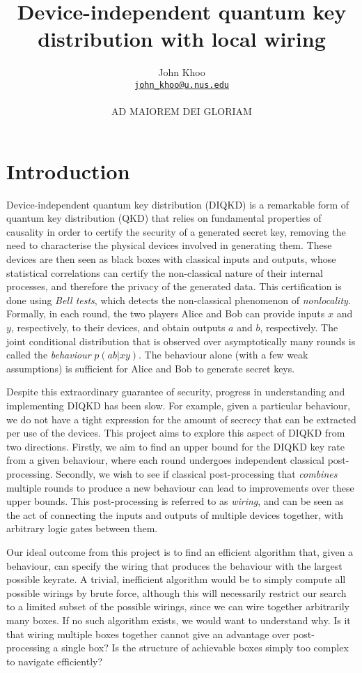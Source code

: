 \documentclass[10pt, a4paper]{article}
\title{Device-independent quantum key distribution with local wiring}
\author{John Khoo\\ \href{mailto:john_khoo@u.nus.edu}{\texttt{john\_khoo@u.nus.edu}} \\\\ AD MAIOREM DEI GLORIAM}
\newcommand{\?}{\mathrel{?}} %
\numberwithin{equation}{section} %
\theoremstyle{definition}
\theoremstyle{plain}
\theoremstyle{plain}
\begin{document}
  \maketitle

  \section{Introduction}

  Device-independent quantum key distribution (DIQKD) is a remarkable form of quantum key distribution (QKD) that relies on fundamental properties of causality in order to certify the security of a generated secret key, removing the need to characterise the physical devices involved in generating them. These devices are then seen as black boxes with classical inputs and outputs, whose statistical correlations can certify the non-classical nature of their internal processes, and therefore the privacy of the generated data. This certification is done using \emph{Bell tests}, which detects the non-classical phenomenon of \emph{nonlocality}. Formally, in each round, the two players Alice and Bob can provide inputs \(x\) and \(y\), respectively, to their devices, and obtain outputs \(a\) and \(b\), respectively. The joint conditional distribution that is observed over asymptotically many rounds is called the \emph{behaviour} \(p(ab|xy)\). The behaviour alone (with a few weak assumptions) is sufficient for Alice and Bob to generate secret keys.

  Despite this extraordinary guarantee of security, progress in understanding and implementing DIQKD has been slow. For example, given a particular behaviour, we do not have a tight expression for the amount of secrecy that can be extracted per use of the devices. This project aims to explore this aspect of DIQKD from two directions. Firstly, we aim to find an upper bound for the DIQKD key rate from a given behaviour, where each round undergoes independent classical post-processing. Secondly, we wish to see if classical post-processing that \emph{combines} multiple rounds to produce a new behaviour can lead to improvements over these upper bounds. This post-processing is referred to as \emph{wiring}, and can be seen as the act of connecting the inputs and outputs of multiple devices together, with arbitrary logic gates between them.

  Our ideal outcome from this project is to find an efficient algorithm that, given a behaviour, can specify the wiring that produces the behaviour with the largest possible keyrate. A trivial, inefficient algorithm would be to simply compute all possible wirings by brute force, although this will necessarily restrict our search to a limited subset of the possible wirings, since we can wire together arbitrarily many boxes. If no such algorithm exists, we would want to understand why. Is it that wiring multiple boxes together cannot give an advantage over post-processing a single box? Is the structure of achievable boxes simply too complex to navigate efficiently?
\end{document}
